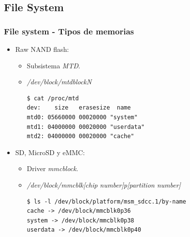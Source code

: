 \subsection{File System}
\begin{frame}[fragile]
  \frametitle{File system - Tipos de memorias}
  \begin{itemize}
      \item Raw NAND flash:
      \begin{itemize}
	  \item Subsistema \textit{MTD}.
	  
	  \item \textit{/dev/block/mtdblockN}
	  
	  \begin{lstlisting}
$ cat /proc/mtd                                                 
dev:    size   erasesize  name
mtd0: 05660000 00020000 "system"
mtd1: 04000000 00020000 "userdata"
mtd2: 04000000 00020000 "cache"
	  \end{lstlisting}
      \end{itemize} 
      
      \item SD, MicroSD y eMMC:
      \begin{itemize}
	  \item Driver \textit{mmcblock}.
	  
	  \item \textit{/dev/block/mmcblk[chip number]p[partition number]}
	  
	  \begin{lstlisting}
$ ls -l /dev/block/platform/msm_sdcc.1/by-name
cache -> /dev/block/mmcblk0p36
system -> /dev/block/mmcblk0p38
userdata -> /dev/block/mmcblk0p40
	  \end{lstlisting}
      \end{itemize}
  \end{itemize}
\end{frame}

